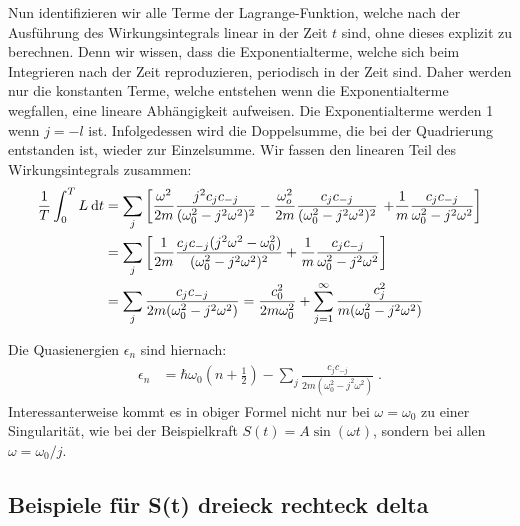    Nun identifizieren wir alle Terme der Lagrange-Funktion, welche nach der Ausführung des Wirkungsintegrals linear in der Zeit $t$ sind, ohne dieses explizit zu berechnen.
   Denn wir wissen, dass die Exponentialterme, welche sich beim Integrieren nach der Zeit reproduzieren, periodisch in der Zeit sind.
   Daher werden nur die konstanten Terme, welche entstehen wenn die Exponentialterme wegfallen, eine lineare Abhängigkeit aufweisen.
   Die Exponentialterme werden 1 wenn $j=-l$ ist.
   Infolgedessen wird die Doppelsumme, die bei der Quadrierung entstanden ist, wieder zur Einzelsumme.
   Wir fassen den linearen Teil des Wirkungsintegrals zusammen:
   \begin{align}
     \begin{split}
       \frac{1}{T} \int_0^T L \: \text d t
       &= \sum_j \left[\frac{\omega^2}{2m} \frac{j^2c_jc_{-j}}{(\omega_0^2-j^2\omega^2)^2}
       - \frac{\omega_o^2}{2m} \frac{c_jc_{-j}}{(\omega_0^2-j^2\omega^2)^2} \right.
       \left. +\frac{1}{m} \frac{c_jc_{-j}}{\omega_0^2-j^2\omega^2}
       \right]\\
       &= \sum_j \left[\frac{1}{2m} \frac{c_jc_{-j}(j^2\omega^2-\omega_0^2)}{(\omega_0^2-j^2\omega^2)^2} + \frac{1}{m} \frac{c_jc_{-j}}{\omega_0^2-j^2\omega^2} \right] \\
       &= \sum_j \frac{c_jc_{-j}}{2m(\omega_0^2-j^2\omega^2)} = \frac{c_0^2}{2m\omega_0^2} + \sum_{j=1}^\infty \frac{c_j^2}{m(\omega_0^2-j^2\omega^2)}
     \end{split}
   \end{align}

   Die Quasienergien $\epsilon_n$ sind hiernach:
   \begin{align}
     \begin{split}
       \epsilon_n &= \hbar \omega_0\left(n+\frac{1}{2}\right) - \sum_j \frac{c_jc_{-j}}{2m(\omega_0^2-j^2\omega^2)} \; .
     \end{split}
   \end{align}
   Interessanterweise kommt es in obiger Formel nicht nur bei $\omega = \omega_0$ zu einer Singularität, wie bei der Beispielkraft $S(t) = A\sin(\omega t)$, sondern bei allen $\omega = \omega_0 / j$.



   \subsection{Beispiele für S(t) dreieck rechteck delta}

